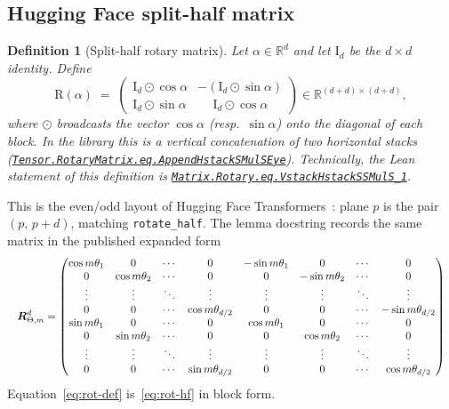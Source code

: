 \documentclass[11pt,a4paper]{article}
\newcommand{\lmod}[1]{\href{http://www.lemma.cn/lean/?module=#1}{\nolinkurl{#1}}}
\newtheorem{definition}[theorem]{Definition}
\newcommand{\R}{\mathbb{R}}
\newcommand{\rot}{\mathrm{R}}
\newcommand{\eye}{\mathrm{I}}
\begin{document}
\subsection{Hugging Face split-half matrix}
\label{sec:def-hf}

\begin{definition}[Split-half rotary matrix]
\label{def:rot}
Let \(\alpha\in\R^d\) and let \(\eye_d\) be the \(d\times d\) identity.
Define
\begin{equation}
  \label{eq:rot-def}
  \rot(\alpha)
  \;=\;
  \begin{pmatrix}
    \eye_d \odot \cos\alpha & -(\eye_d \odot \sin\alpha) \\
    \eye_d \odot \sin\alpha & \phantom{-}\eye_d \odot \cos\alpha
  \end{pmatrix}
  \in \R^{(d+d)\times(d+d)},
\end{equation}
where \(\odot\) broadcasts the vector \(\cos\alpha\) (resp.\ \(\sin\alpha\)) onto the diagonal of each block.
In the library this is a vertical concatenation of two horizontal stacks
(\lmod{Tensor.RotaryMatrix.eq.AppendHstackSMulSEye}).
Technically, the Lean statement of this definition is
\href{http://localhost/lean/?lemma=Matrix.Rotary.eq.VstackHstackSSMulS_1}{\nolinkurl{Matrix.Rotary.eq.VstackHstackSSMulS_1}}.
\end{definition}

This is the even/odd layout of Hugging Face Transformers~\cite{huggingface_rope_utils}: plane \(p\) is the pair \((p,\,p+d)\), matching \texttt{rotate\_half}.
The lemma docstring records the same matrix in the published expanded form
\begin{equation}
\label{eq:rot-hf}
\resizebox{\linewidth}{!}{\(\displaystyle
{\boldsymbol{R}}^{d}_{\Theta,m}=\begin{pmatrix}
\cos m\theta_{1} & 0 & \cdots & 0 & -\sin m\theta_{1} & 0 & \cdots & 0 \\
0 & \cos m\theta_{2} & \cdots & 0 & 0 & -\sin m\theta_{2} & \cdots & 0 \\
\vdots & \vdots & \ddots & \vdots & \vdots & \vdots & \ddots & \vdots \\
0 & 0 & \cdots & \cos m\theta_{d/2} & 0 & 0 & \cdots & -\sin m\theta_{d/2} \\
\sin m\theta_{1} & 0 & \cdots & 0 & \cos m\theta_{1} & 0 & \cdots & 0 \\
0 & \sin m\theta_{2} & \cdots & 0 & 0 & \cos m\theta_{2} & \cdots & 0 \\
\vdots & \vdots & \ddots & \vdots & \vdots & \vdots & \ddots & \vdots \\
0 & 0 & \cdots & \sin m\theta_{d/2} & 0 & 0 & \cdots & \cos m\theta_{d/2}
\end{pmatrix}
\)}
\end{equation}
Equation~\eqref{eq:rot-def} is~\eqref{eq:rot-hf} in block form.
\end{document}
